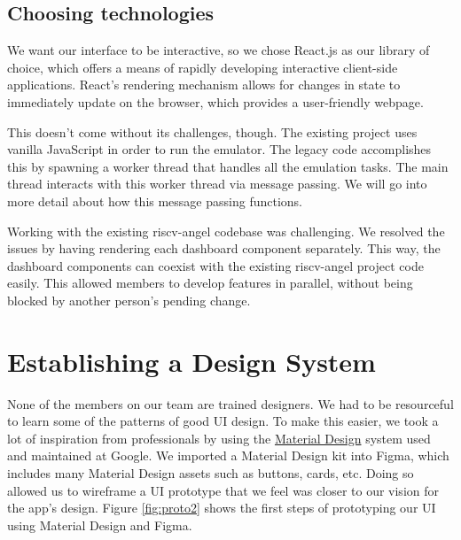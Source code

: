 \subsection*{Choosing technologies}

We want our interface to be interactive, so we chose React.js as our library of choice,
which offers a means of rapidly developing interactive client-side applications. React's
rendering mechanism allows for changes in state to immediately update on the browser,
which provides a user-friendly webpage.

This doesn't come without its challenges, though. The existing project uses vanilla JavaScript
in order to run the emulator. The legacy code accomplishes this by spawning a worker thread
that handles all the emulation tasks. The main thread interacts with this worker thread via
message passing. We will go into more detail about how this message passing functions.

Working with the existing riscv-angel codebase was challenging. We resolved
the issues by having rendering each dashboard component separately. This way,
the dashboard components can coexist with the existing riscv-angel project code
easily. This allowed members to develop features in parallel, without being blocked
by another person's pending change.


\section{Establishing a Design System}

None of the members on our team are trained designers. We had to be resourceful
to learn some of the patterns of good UI design. To make this easier, we took
a lot of inspiration from professionals by using the \href{https://material.io/design}{Material Design}
system used and maintained at Google. We imported a Material Design kit into Figma,
which includes many Material Design assets such as buttons, cards, etc. Doing so
allowed us to wireframe a UI prototype that we feel was closer to our vision for the app's design.
Figure \ref{fig:proto2} shows the first steps of prototyping our UI using Material Design and Figma.


